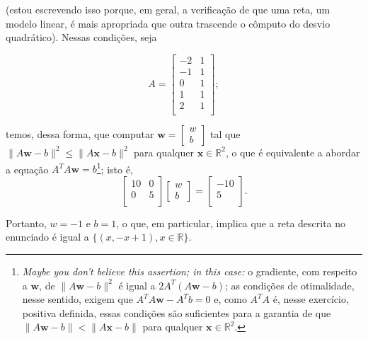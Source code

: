 \documentclass[leqno]{article}
\begin{document}
\begin{enumerate}
\begin{sol}
	\noindent (estou escrevendo isso porque, em geral, a verificação de que uma reta, um modelo linear, é mais apropriada que outra trascende o cômputo do desvio quadrático). Nessas condições, seja 

	\begin{equation*} 
		A = 
		\begin{bmatrix} 
			-2 & 1 \\ 
			-1 & 1 \\ 
			0 & 1 \\ 
			1 & 1 \\ 
			2 & 1 \\ 
		\end{bmatrix};   
	\end{equation*} 

	\noindent temos, dessa forma, que computar $\mathbf{w} = \begin{bmatrix} w \\ b \end{bmatrix}$ tal que $\|A\mathbf{w} - b\|^{2} \le \|A\mathbf{x} - b\|^{2}$ para qualquer $\mathbf{x} \in \mathbb{R}^{2}$, o que é equivalente a abordar a equação $A^{T}A\mathbf{w} = b$\footnote{\textit{Maybe you don't believe this assertion; in this case:} o gradiente, com respeito a $\mathbf{w}$, de $\|A\mathbf{w} - b\|^{2}$ é igual a $2A^{T}(A\mathbf{w} - b)$; as condições de otimalidade, nesse sentido, exigem que $A^{T}A\mathbf{w} - A^{T}b = 0$ e, como $A^{T}A$ é, nesse exercício, positiva definida, essas condições são suficientes para a garantia de que $\|A\mathbf{w} - b\| < \|A\mathbf{x} - b\|$ para qualquer $\mathbf{x} \in \mathbb{R}^{2}$.}; isto é, 
	\begin{equation*} 
		\begin{bmatrix} 
			10 & 0 \\ 
			0 & 5 \\ 
		\end{bmatrix} 
		\begin{bmatrix} 
			w \\ 
			b 
		\end{bmatrix} = 
		\begin{bmatrix} 
			-10 \\ 
			5 \\ 
		\end{bmatrix}.  
	\end{equation*} 

	\noindent Portanto, $w = -1$ e $b = 1$, o que, em particular, implica que a reta descrita no enunciado é igual a $\{(x, -x + 1), x \in \mathbb{R}\}$. 


\end{sol}
\end{enumerate}
\end{document}
